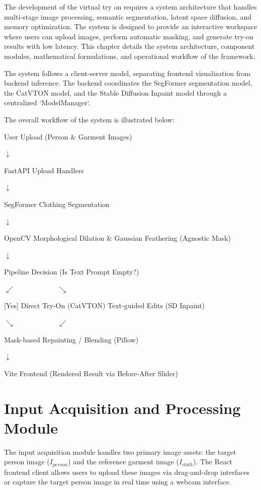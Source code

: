 \documentclass[12pt, a4paper]{report}
\begin{document}
The development of the virtual try on requires a system architecture that handles multi-stage image processing, semantic segmentation, latent space diffusion, and memory optimization. The system is designed to provide an interactive workspace where users can upload images, perform automatic masking, and generate try-on results with low latency. This chapter details the system architecture, component modules, mathematical formulations, and operational workflow of the framework.


The system follows a client-server model, separating frontend visualization from backend inference. The backend coordinates the SegFormer segmentation model, the CatVTON model, and the Stable Diffusion Inpaint model through a centralized `ModelManager`.

The overall workflow of the system is illustrated below:

\begin{center}
User Upload (Person \& Garment Images)

$\downarrow$

FastAPI Upload Handlers

$\downarrow$

SegFormer Clothing Segmentation

$\downarrow$

OpenCV Morphological Dilation \& Gaussian Feathering (Agnostic Mask)

$\downarrow$

Pipeline Decision (Is Text Prompt Empty?)

$\swarrow \quad\quad\quad\quad\quad\quad \searrow$

[Yes] Direct Try-On (CatVTON)  \quad\quad\quad\quad [No] Text-guided Edits (SD Inpaint)

$\searrow \quad\quad\quad\quad\quad\quad \swarrow$

Mask-based Repainting / Blending (Pillow)

$\downarrow$

Vite Frontend (Rendered Result via Before-After Slider)
\end{center}

\section{Input Acquisition and Processing Module}

The input acquisition module handles two primary image assets: the target person image ($I_{person}$) and the reference garment image ($I_{cloth}$). The React frontend client allows users to upload these images via drag-and-drop interfaces or capture the target person image in real time using a webcam interface.
\end{document}
